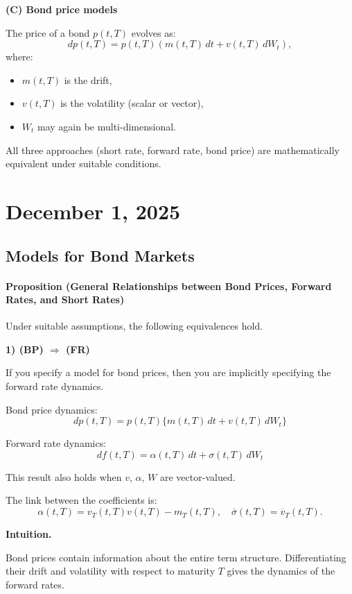 \documentclass[12pt,a4paper]{article}
\theoremstyle{definition}
\begin{document}
\textbf{(C) Bond price models}

The price of a bond $p(t, T)$ evolves as:
\[
dp(t, T) = p(t, T)(m(t, T) \, dt + v(t, T) \, dW_t),
\]
where:

\begin{itemize}
\item $m(t, T)$ is the drift,
\item $v(t, T)$ is the volatility (scalar or vector),
\item $W_t$ may again be multi-dimensional.
\end{itemize}

All three approaches (short rate, forward rate, bond price) are mathematically equivalent under suitable conditions.

\newpage
\section{December 1, 2025}

\subsection{Models for Bond Markets}

\paragraph{Proposition (General Relationships between Bond Prices, Forward Rates, and Short Rates)}

Under suitable assumptions, the following equivalences hold.

\textbf{1) (BP) $\Rightarrow$ (FR)}

If you specify a model for bond prices, then you are implicitly specifying the forward rate dynamics.

Bond price dynamics:
\[
dp(t, T) = p(t, T)\{m(t, T) \, dt + v(t, T) \, dW_t\} \tag{BP}
\]

Forward rate dynamics:
\[
df(t, T) = \alpha(t, T) \, dt + \sigma(t, T) \, dW_t
\]

This result also holds when $v$, $\alpha$, $W$ are vector-valued.

The link between the coefficients is:
\[
\alpha(t, T) = v_T(t, T)v(t, T) - m_T(t, T), \quad \overline{\sigma}(t, T) = \overline{v}_T(t, T).
\]

\textbf{Intuition.}

Bond prices contain information about the entire term structure. Differentiating their drift and volatility with respect to maturity $T$ gives the dynamics of the forward rates.
\end{document}
